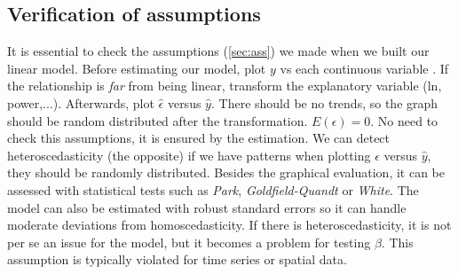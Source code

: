 \subsection{Verification of assumptions}
	It is essential to check the assumptions (\ref{sec:ass}) we made when we built our linear model.
		Before estimating our model, plot $y$ vs each continuous variable . If the relationship is \emph{far} from being linear, transform the explanatory variable (ln, power,...). Afterwards, plot $\hat{\epsilon}$ versus $\hat{y}$. There should be no trends, so the graph should be random distributed after the transformation.
		$E(\epsilon)=0$. No need to check this assumptions, it is ensured by the estimation.
		We can detect heteroscedasticity (the opposite) if we have patterns when plotting $\hat{\epsilon}$ versus $\hat{y}$, they should be randomly distributed. Besides the graphical evaluation, it can be assessed with statistical tests such as \emph{Park}, \emph{Goldfield-Quandt} or \emph{White}. The model can also be estimated with robust standard errors so it can handle moderate deviations from homoscedasticity. If there is heteroscedasticity, it is not per se an issue for the model, but it becomes a problem for testing $\beta$.
		This assumption is typically violated for time series or spatial data.
